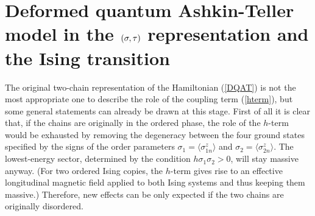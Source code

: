 \section{Deformed quantum Ashkin-Teller 
model in the $(\sigma,\tau)$ representation
and the Ising transition}
\label{DAT}

The original two-chain representation of the Hamiltonian (\ref{DQAT}) 
is not the most appropriate one to describe the role of the 
coupling term (\ref{hterm}), but some general 
statements can already be drawn at this stage. First of all it is 
clear that, if the chains are originally in the ordered phase, 
the role of the $h$-term would be exhausted by removing the
degeneracy between the four ground states specified by
the signs of the order parameters $\sigma_1 = \langle\sigma^z_{1n}\rangle$ 
and $\sigma_2 = \langle \sigma^z_{2n}\rangle$. The lowest-energy sector,
determined by the condition $h\sigma_1\sigma_2>0$, will stay massive anyway.
(For two ordered Ising copies, the $h$-term gives rise to an effective
longitudinal magnetic field applied to both Ising systems and
thus keeping them massive.)
Therefore, new effects can be only expected if
the two chains are originally disordered. 


